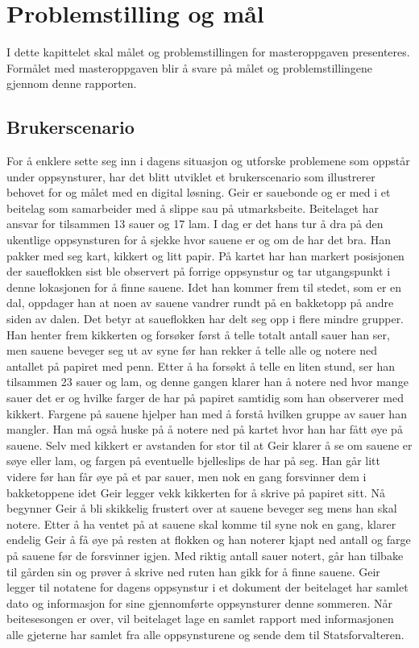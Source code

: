 \chapter{Problemstilling og mål}
I dette kapittelet skal målet og problemstillingen for masteroppgaven presenteres. Formålet med masteroppgaven blir å svare på målet og problemstillingene gjennom denne rapporten. 

\section{Brukerscenario}
For å enklere sette seg inn i dagens situasjon og utforske problemene som oppstår under oppsynsturer, har det blitt utviklet et brukerscenario som illustrerer behovet for og målet med en digital løsning.  
\newline
\newline
Geir er sauebonde og er med i et beitelag som samarbeider med å slippe sau på utmarksbeite. Beitelaget har ansvar for tilsammen 13 sauer og 17 lam. I dag er det hans tur å dra på den ukentlige oppsynsturen for å sjekke hvor sauene er og om de har det bra. Han pakker med seg kart, kikkert og litt papir. På kartet har han markert posisjonen der saueflokken  sist ble observert på forrige oppsynstur og tar utgangspunkt i denne lokasjonen for å finne sauene. Idet han kommer frem til stedet, som er en dal, oppdager han at noen av sauene vandrer rundt på en bakketopp på andre siden av dalen. Det betyr at saueflokken har delt seg opp i flere mindre grupper. Han henter frem kikkerten og forsøker først å telle totalt antall sauer han ser, men sauene beveger seg ut av syne før han rekker å telle alle og notere ned antallet på papiret med penn. Etter å ha forsøkt å telle en liten stund, ser han tilsammen 23 sauer og lam, og denne gangen klarer han å notere ned hvor mange sauer det er og hvilke farger de har på papiret samtidig som han observerer med kikkert. Fargene på sauene hjelper han med å forstå hvilken gruppe av sauer han mangler. Han må også huske på å notere ned på kartet hvor han har fått øye på sauene. Selv med kikkert er avstanden for stor til at Geir klarer å se om sauene er søye eller lam, og fargen på eventuelle bjelleslips de har på seg. Han går litt videre før han får øye på et par sauer, men nok en gang forsvinner dem i bakketoppene idet Geir legger vekk kikkerten for å skrive på papiret sitt. Nå begynner Geir å bli skikkelig frustert over at sauene beveger seg mens han skal notere. Etter å ha ventet på at sauene skal komme til syne nok en gang, klarer endelig Geir å få øye på resten at flokken og han noterer kjapt ned antall og farge på sauene før de forsvinner igjen. Med riktig antall sauer notert, går han tilbake til gården sin og prøver å skrive ned ruten han gikk for å finne sauene. Geir legger til notatene for dagens oppsynstur i et dokument der beitelaget har samlet dato og informasjon for sine gjennomførte oppsynsturer denne sommeren. Når beitesesongen er over, vil beitelaget lage en samlet rapport med informasjonen alle gjeterne har samlet fra alle oppsynsturene og sende dem til Statsforvalteren. 

